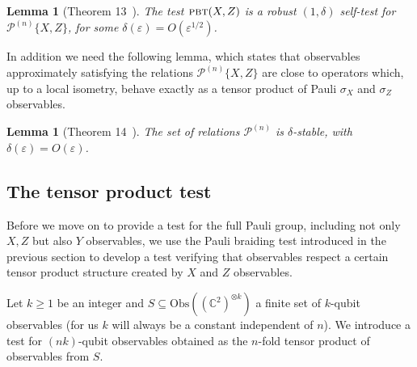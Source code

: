 \documentclass[11pt]{article}
\newtheorem{lemma}[theorem]{Lemma}
\theoremstyle{remark}
\theoremstyle{definition}
\newcommand{\C}{\ensuremath{\mathbb{C}}}
\newcommand{\setft}[1]{\mathrm{#1}}
\newcommand{\Obs}{\setft{Obs}}
\newcommand{\eps}{\varepsilon}
\newcommand{\pbt}{\textsc{pbt}}
\newcommand{\paulin}{\mathcal{P}^{(n)}\!}
\begin{document}
\begin{lemma}[Theorem 13~\cite{natarajan2016robust}]
The test $\pbt(X,Z)$ is a robust $(1,\delta)$ self-test 
for $\paulin\{X,Z\}$, for some $\delta(\eps) = O(\eps^{1/2})$. 
\end{lemma}

In addition we need the following lemma, which states that observables approximately satisfying the relations $\paulin\{X,Z\}$ are close to operators which, up to a local isometry, behave exactly as a tensor product of Pauli $\sigma_X$ and $\sigma_Z$ observables. 


\begin{lemma}[Theorem 14~\cite{natarajan2016robust}]\label{lem:pauli-stable}
The set of relations $\mathcal{P}^{(n)}$ is $\delta$-stable, with $\delta(\eps) = O(\eps)$.
\end{lemma}



\subsection{The tensor product test}
\label{sec:perm}

Before we move on to provide a test for the full Pauli group, including not only $X,Z$ but also $Y$ observables, we use the Pauli braiding test introduced in the previous section to develop a test verifying that observables respect a certain tensor product structure created by $X$ and $Z$ observables. 

Let $k\geq 1$ be an integer and $S\subseteq \Obs((\C^2)^{\otimes k})$ a finite set of $k$-qubit observables (for us $k$ will always be a constant independent of $n$). We introduce a test for $(nk)$-qubit observables obtained as the $n$-fold tensor product of observables from $S$. 
\end{document}

